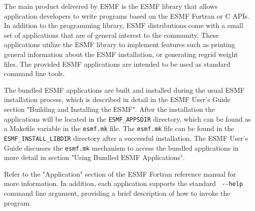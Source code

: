 
The main product delivered by ESMF is the ESMF library that allows application
developers to write programs based on the ESMF Fortran or C APIs. In addition to 
the programming library, ESMF distributions come with a small set of applications
that are of general interest to the community. These applications utilize
the ESMF library to implement features such as printing general information
about the ESMF installation, or generating regrid weight files. The provided
ESMF applications are intended to be used as standard command line tools.

The bundled ESMF applications are built and installed during the usual ESMF 
installation process, which is described in detail in the ESMF User's Guide 
section "Building and Installing the ESMF". After the installation the 
applications will be located in the {\tt ESMF\_APPSDIR} directory, which can 
be found as a Makefile variable in the {\tt esmf.mk} file. The {\tt esmf.mk} 
file can be found in the {\tt ESMF\_INSTALL\_LIBDIR} directory after a 
successful installation.  The ESMF User's Guide discusses the {\tt esmf.mk} 
mechanism to access the bundled applications in more detail in section 
"Using Bundled ESMF Applications".

Refer to the "Application" section of the ESMF Fortran reference manual
for more information. In addition, each application supports the standard 
\verb+ --help + command line argument, providing a brief description of 
how to invoke the program.


